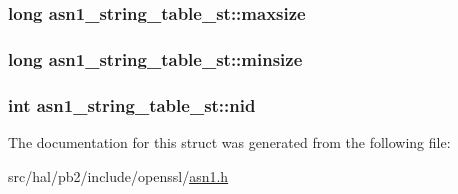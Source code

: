 \subsubsection[{\texorpdfstring{maxsize}{maxsize}}]{\setlength{\rightskip}{0pt plus 5cm}long asn1\+\_\+string\+\_\+table\+\_\+st\+::maxsize}\hypertarget{structasn1__string__table__st_a8a4de03a35f1840e86f9aa8ba934a42f}{}\label{structasn1__string__table__st_a8a4de03a35f1840e86f9aa8ba934a42f}
\subsubsection[{\texorpdfstring{minsize}{minsize}}]{\setlength{\rightskip}{0pt plus 5cm}long asn1\+\_\+string\+\_\+table\+\_\+st\+::minsize}\hypertarget{structasn1__string__table__st_a4428b94f772280133e146a55e2731610}{}\label{structasn1__string__table__st_a4428b94f772280133e146a55e2731610}
\subsubsection[{\texorpdfstring{nid}{nid}}]{\setlength{\rightskip}{0pt plus 5cm}int asn1\+\_\+string\+\_\+table\+\_\+st\+::nid}\hypertarget{structasn1__string__table__st_afc0e790d52b34b5f3705214ee92fa207}{}\label{structasn1__string__table__st_afc0e790d52b34b5f3705214ee92fa207}


The documentation for this struct was generated from the following file\+:\begin{DoxyCompactItemize}
\item 
src/hal/pb2/include/openssl/\hyperlink{asn1_8h}{asn1.\+h}\end{DoxyCompactItemize}
